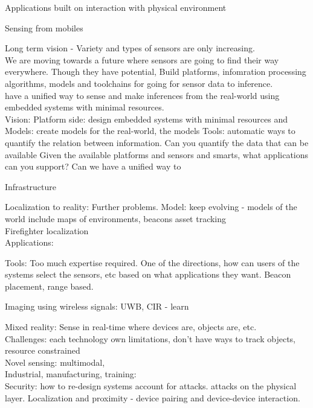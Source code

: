 \documentclass[10pt]{article}
\begin{document}
Applications built on interaction with physical environment 

Sensing from mobiles 


Long term vision - 
Variety and types of sensors are only increasing.\\

We are moving towards a future where sensors are going to find their way everywhere. Though they have potential, 
Build platforms, infomration processing algorithms, models and toolchains for going for sensor data to inference.\\

have a unified way to sense and make inferences from the real-world using embedded systems with minimal resources. \\
Vision:
Platform side: design embedded systems with minimal resources and \\
Models: create models for the real-world, the models 
Tools: automatic ways to quantify the relation between information. Can you quantify the data that can be available 
Given the available platforms and sensors and smarts, what applications can you support? Can we have a unified way to 

Infrastructure 

Localization to reality:
Further problems.
Model: keep evolving - models of the world include maps of environments, beacons
asset tracking\\
Firefighter localization\\ 

Applications:

Tools:
Too much expertise required. One of the directions, how can users of the systems select the sensors, etc based on what applications they want.  
Beacon placement, range based.

Imaging using wireless signals:
UWB, CIR - learn 

Mixed reality:
Sense in real-time where devices are, objects are, etc.\\
Challenges: each technology own limitations, don't have ways to track objects, resource constrained\\
Novel sensing: multimodal, \\

Industrial, manufacturing, training:\\

Security:
how to re-design systems account for attacks.
attacks on the physical layer.
Localization and proximity - device pairing and device-device interaction.
\end{document}

